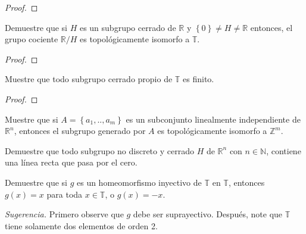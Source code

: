 \documentclass[12pt]{report}
\theoremstyle{largebreak}
\begin{document}
    \begin{proof}
        
    \end{proof}

    \begin{excer}
        Demuestre que si $H$ es un subgrupo cerrado de $\mathbb{R}$ y $\left\{0 \right\}\neq H\neq\mathbb{R}$ entonces, el grupo cociente $\mathbb{R}/H$ es topológicamente isomorfo a $\mathbb{T}$.
    \end{excer}

    \begin{proof}
        
    \end{proof}

    \begin{excer}
        Muestre que todo subgrupo cerrado propio de $\mathbb{T}$ es finito.
    \end{excer}

    \begin{proof}
        
    \end{proof}

    \begin{excer}
        Muestre que si $A=\left\{a_1,..,a_m \right\}$ es un subconjunto linealmente independiente de $\mathbb{R}^n$, entonces el subgrupo generado por $A$ es topológicamente isomorfo a $\mathbb{Z}^m$.
    \end{excer}

    \begin{excer}
        Demuestre que todo subgrupo no discreto y cerrado $H$ de $\mathbb{R}^n$ con $n\in\mathbb{N}$, contiene una línea recta que pasa por el cero.
    \end{excer}

    \begin{excer}
        Demuestre que si $g$ es un homeomorfismo inyectivo de $\mathbb{T}$ en $\mathbb{T}$, entonces $g(x)=x$ para toda $x\in\mathbb{T}$, o $g(x)=-x$.

        \textit{Sugerencia.} Primero observe que $g$ debe ser suprayectivo. Después, note que $\mathbb{T}$ tiene solamente dos elementos de orden 2.
    \end{excer}
\end{document}
